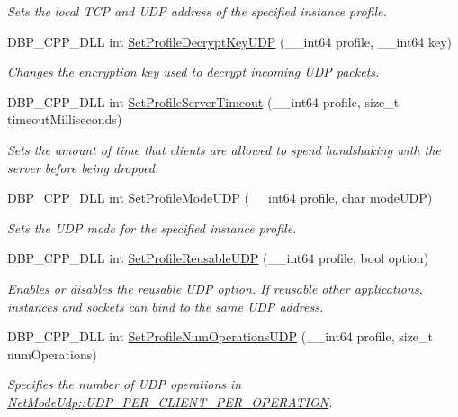\begin{DoxyCompactItemize}
\begin{DoxyCompactList}\small\item\em Sets the local TCP and UDP address of the specified instance profile. \item\end{DoxyCompactList}\item 
DBP\_\-CPP\_\-DLL int \hyperlink{namespacemn_a9d64e3c108c8aab36271ac4751dd0c56}{SetProfileDecryptKeyUDP} (\_\-\_\-int64 profile, \_\-\_\-int64 key)
\begin{DoxyCompactList}\small\item\em Changes the encryption key used to decrypt incoming UDP packets. \item\end{DoxyCompactList}\item 
DBP\_\-CPP\_\-DLL int \hyperlink{namespacemn_a9c3118c75c09780b67a93126237385d6}{SetProfileServerTimeout} (\_\-\_\-int64 profile, size\_\-t timeoutMilliseconds)
\begin{DoxyCompactList}\small\item\em Sets the amount of time that clients are allowed to spend handshaking with the server before being dropped. \item\end{DoxyCompactList}\item 
DBP\_\-CPP\_\-DLL int \hyperlink{namespacemn_a26e692b76b3c7de234bdc106241bb0ec}{SetProfileModeUDP} (\_\-\_\-int64 profile, char modeUDP)
\begin{DoxyCompactList}\small\item\em Sets the UDP mode for the specified instance profile. \item\end{DoxyCompactList}\item 
DBP\_\-CPP\_\-DLL int \hyperlink{namespacemn_ae8c0e5371300f58773ee06e0a24484ae}{SetProfileReusableUDP} (\_\-\_\-int64 profile, bool option)
\begin{DoxyCompactList}\small\item\em Enables or disables the reusable UDP option. If reusable other applications, instances and sockets can bind to the same UDP address. \item\end{DoxyCompactList}\item 
DBP\_\-CPP\_\-DLL int \hyperlink{namespacemn_abdc6d771977a7314824360236da3e966}{SetProfileNumOperationsUDP} (\_\-\_\-int64 profile, size\_\-t numOperations)
\begin{DoxyCompactList}\small\item\em Specifies the number of UDP operations in \hyperlink{class_net_mode_a43cfa55ee6a4db66a8d7d6c27f766964a947fd0828716fc0442ea546cce111c27}{NetModeUdp::UDP\_\-PER\_\-CLIENT\_\-PER\_\-OPERATION}. \item\end{DoxyCompactList}\item 

\end{DoxyCompactItemize}
